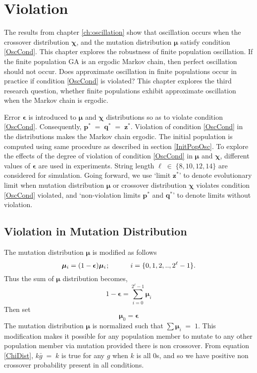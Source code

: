 \chapter{Violation} \label{ch:evolutionary limits}
The results from chapter \ref{ch:oscillation} show that oscillation occurs
when the crossover distribution $\bm{\chi}$, and the mutation distribution $\bm{\mu}$ 
satisfy condition \ref{OscCond}. This chapter explores the robustness of finite population oscillation. 
If the finite population GA is an ergodic Markov chain, then perfect oscillation should not occur. Does approximate oscillation 
in finite populations occur in practice if condition \ref{OscCond} is violated? 
This chapter explores the  
third research question, whether finite populations exhibit approximate oscillation when the Markov chain 
is ergodic.

Error $\bm{\epsilon}$ is introduced to $\bm{\mu}$ and $\bm{\chi}$ distributions so as to 
violate condition \ref{OscCond}. Consequently, $\bm{p}^\ast \;=\; \bm{q}^\ast \;=\; \bm{z}^\ast$. 
Violation of condition \ref{OscCond} in the distributions makes the Markov chain ergodic. The initial population is 
computed using same procedure as described in section \ref{InitPopOsc}. To explore the effects of the degree  
of violation of condition \ref{OscCond} in $\bm{\mu}$ and $\bm{\chi}$, different values of $\bm{\epsilon}$ are used in experiments. 
String length $\ell \;\in\; \{8, 10, 12, 14\}$ are considered for simulation.
Going forward, we use `limit $\bm{z}^\ast$' to denote evolutionary limit when mutation distribution $\bm{\mu}$ or crossover distribution 
$\bm{\chi}$ violates condition \ref{OscCond} violated, and 
`non-violation limits $\bm{p}^\ast$ and $\bm{q}^\ast$' to denote limits without violation.

\section{Violation in Mutation Distribution}
The mutation distribution $\bm{\mu}$ is modified as follows
\[
\bm{\mu}_i = (1-\bm{\epsilon}) \bm{\mu}_i \hspace{0.01in}; \hspace{30pt} i = \{0, 1, 2,.., 2^{\ell}-1\}.
\]
Thus the sum of $\bm{\mu}$ distribution becomes, 
\[
1-\bm{\epsilon} = \sum \limits_{i=0}^{2^{\ell}-1} \bm{\mu}_i
\]
Then set
\[
\bm{\mu}_0 = \bm{\epsilon}
\]
The mutation distribution $\bm{\mu}$ is normalized such that  $\sum \bm{\mu}_i \;=\; 1$.
This modification makes it possible for any population member to mutate to any other population member via mutation 
provided there is non crossover. From equation \ref{ChiDist}, $k \bar{g} \;=\; k$ is true for any $g$ when $k$ is all $0$s, 
and so we have positive non crossover probability present in all conditions. 

